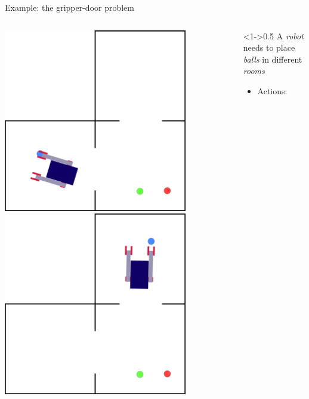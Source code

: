 \begin{frame}[c,fragile]{Example: the gripper-door problem}
\begin{columns}[T]
\begin{column}
\begin{overprint}
                \includegraphics[width = 0.8\textwidth]{images/3_rooms/gd_3_3.png}
                \includegraphics[width = 0.8\textwidth]{images/3_rooms/gd_3_6.png}
            \end{overprint}
        \end{column}
        \begin{column}<1->{0.5\textwidth}
            A \textit{robot} needs to place \textit{balls} in different \textit{rooms}
            \small
            \begin{itemize}
                \item Actions:

\end{itemize}
\end{column}
\end{columns}
\end{frame}
